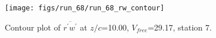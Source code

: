 \begin{figure}[H]
\centering
\texttt{[image: figs/run\_68/run\_68\_rw\_contour]}
\caption{Contour plot of $\overline{r^\prime w^\prime}$ at $z/c$=10.00, $V_{free}$=29.17, station 7.}
\label{fig:run_68_rw_contour}
\end{figure}


